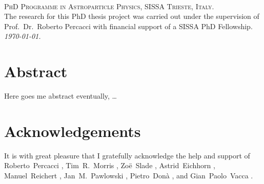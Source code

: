 \documentclass[11pt]{book}
\numberwithin{equation}{chapter}
\begin{document}
\frontmatter %



\newpage
~\vfill
\thispagestyle{empty}

\noindent \textsc{PhD Programme in Astroparticle Physics, SISSA Trieste, Italy.}\\

\noindent The research for this PhD thesis project was carried out
under the supervision of Prof.~Dr.~Roberto Percacci with financial support
of a SISSA PhD Fellowship.\\

\noindent \textit{\monthyeardate\today.} %



{}
\chapter*{Abstract}

\vfill
\begin{center}
  Here goes me abstract eventually, \dots
\end{center}
\vfill


\makeatletter
\@openrightfalse
\makeatother

\chapter*{Acknowledgements}

It is with great pleasure that I gratefully acknowledge the help and support
of
Roberto~Percacci%
, Tim~R.~Morris%
, Zo\"e~Slade%
, Astrid~Eichhorn%
, Manuel~Reichert%
, Jan~M.~Pawlowski%
, Pietro~Don\`a%
, and
Gian~Paolo~Vacca%
.
\end{document}
